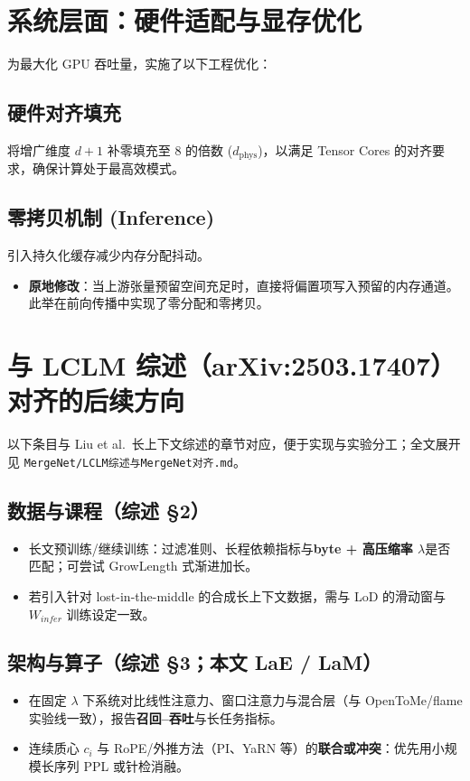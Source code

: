 \documentclass[a4paper,11pt]{article}
\begin{document}
\section*{系统层面：硬件适配与显存优化}

为最大化 GPU 吞吐量，实施了以下工程优化：

\subsection*{硬件对齐填充}
将增广维度 $d+1$ 补零填充至 8 的倍数 ($d_{\text{phys}}$)，以满足 Tensor Cores 的对齐要求，确保计算处于最高效模式。

\subsection*{零拷贝机制 (Inference)}
引入持久化缓存减少内存分配抖动。
\begin{itemize}
    \item \textbf{原地修改}：当上游张量预留空间充足时，直接将偏置项写入预留的内存通道。此举在前向传播中实现了零分配和零拷贝。
\end{itemize}

\section*{与 LCLM 综述（arXiv:2503.17407）对齐的后续方向}

以下条目与 Liu et al.\ 长上下文综述的章节对应，便于实现与实验分工；全文展开见 \texttt{MergeNet/LCLM综述与MergeNet对齐.md}。

\subsection*{数据与课程（综述 \S2）}
\begin{itemize}
    \item 长文预训练/继续训练：过滤准则、长程依赖指标与\textbf{byte + 高压缩率 $\lambda$}是否匹配；可尝试 GrowLength 式渐进加长。
    \item 若引入针对 lost-in-the-middle 的合成长上下文数据，需与 LoD 的滑动窗与 $W_{infer}$ 训练设定一致。
\end{itemize}

\subsection*{架构与算子（综述 \S3；本文 LaE / LaM）}
\begin{itemize}
    \item 在固定 $\lambda$ 下系统对比线性注意力、窗口注意力与混合层（与 OpenToMe/flame 实验线一致），报告\textbf{召回--吞吐}与长任务指标。
    \item 连续质心 $c_i$ 与 RoPE/外推方法（PI、YaRN 等）的\textbf{联合或冲突}：优先用小规模长序列 PPL 或针检消融。
\end{itemize}
\end{document}
